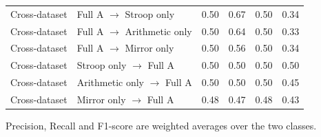 \begin{table}[!ht]
\begin{tabular}{|l|l|c|c|c|c|}
Cross-dataset       & Full A $\rightarrow$ Stroop only        & 0.50 & 0.67 & 0.50 & 0.34 \\
Cross-dataset       & Full A $\rightarrow$ Arithmetic only    & 0.50 & 0.64 & 0.50 & 0.33 \\
Cross-dataset       & Full A $\rightarrow$ Mirror only        & 0.50 & 0.56 & 0.50 & 0.34 \\
Cross-dataset       & Stroop only $\rightarrow$ Full A        & 0.50 & 0.50 & 0.50 & 0.50 \\
Cross-dataset       & Arithmetic only $\rightarrow$ Full A    & 0.50 & 0.50 & 0.50 & 0.45 \\
Cross-dataset       & Mirror only $\rightarrow$ Full A        & 0.48 & 0.47 & 0.48 & 0.43 \\
\hline
\end{tabular}
\end{table}

Precision, Recall and F1-score are weighted averages over the two classes.
